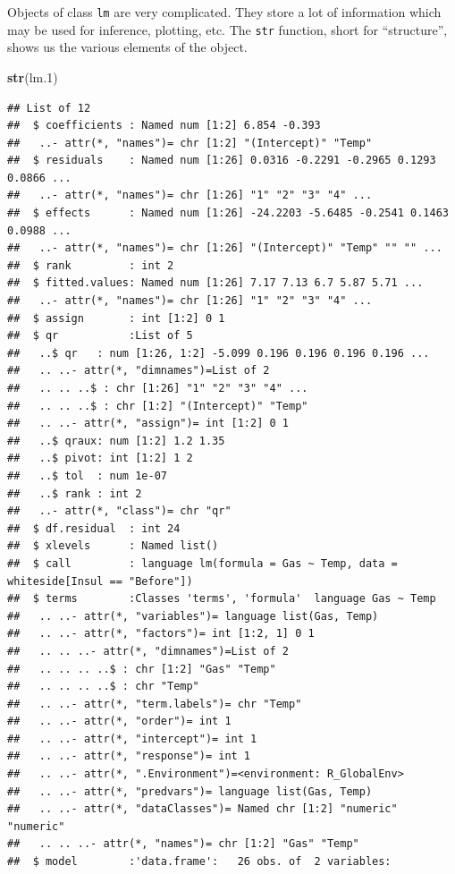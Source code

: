 \documentclass[]{book}
\newenvironment{Shaded}{\begin{snugshade}}{\end{snugshade}}
\newcommand{\FloatTok}[1]{\textcolor[rgb]{0.00,0.00,0.81}{#1}}
\newcommand{\KeywordTok}[1]{\textcolor[rgb]{0.13,0.29,0.53}{\textbf{#1}}}
\newcommand{\NormalTok}[1]{#1}
\theoremstyle{definition}
\theoremstyle{definition}
\theoremstyle{definition}
\theoremstyle{remark}
\begin{document}
Objects of class \texttt{lm} are very complicated.
They store a lot of information which may be used for inference, plotting, etc.
The \texttt{str} function, short for ``structure'', shows us the various elements of the object.

\begin{Shaded}
\begin{Highlighting}[]
\KeywordTok{str}\NormalTok{(lm}\FloatTok{.1}\NormalTok{)}
\end{Highlighting}
\end{Shaded}

\begin{verbatim}
## List of 12
##  $ coefficients : Named num [1:2] 6.854 -0.393
##   ..- attr(*, "names")= chr [1:2] "(Intercept)" "Temp"
##  $ residuals    : Named num [1:26] 0.0316 -0.2291 -0.2965 0.1293 0.0866 ...
##   ..- attr(*, "names")= chr [1:26] "1" "2" "3" "4" ...
##  $ effects      : Named num [1:26] -24.2203 -5.6485 -0.2541 0.1463 0.0988 ...
##   ..- attr(*, "names")= chr [1:26] "(Intercept)" "Temp" "" "" ...
##  $ rank         : int 2
##  $ fitted.values: Named num [1:26] 7.17 7.13 6.7 5.87 5.71 ...
##   ..- attr(*, "names")= chr [1:26] "1" "2" "3" "4" ...
##  $ assign       : int [1:2] 0 1
##  $ qr           :List of 5
##   ..$ qr   : num [1:26, 1:2] -5.099 0.196 0.196 0.196 0.196 ...
##   .. ..- attr(*, "dimnames")=List of 2
##   .. .. ..$ : chr [1:26] "1" "2" "3" "4" ...
##   .. .. ..$ : chr [1:2] "(Intercept)" "Temp"
##   .. ..- attr(*, "assign")= int [1:2] 0 1
##   ..$ qraux: num [1:2] 1.2 1.35
##   ..$ pivot: int [1:2] 1 2
##   ..$ tol  : num 1e-07
##   ..$ rank : int 2
##   ..- attr(*, "class")= chr "qr"
##  $ df.residual  : int 24
##  $ xlevels      : Named list()
##  $ call         : language lm(formula = Gas ~ Temp, data = whiteside[Insul == "Before"])
##  $ terms        :Classes 'terms', 'formula'  language Gas ~ Temp
##   .. ..- attr(*, "variables")= language list(Gas, Temp)
##   .. ..- attr(*, "factors")= int [1:2, 1] 0 1
##   .. .. ..- attr(*, "dimnames")=List of 2
##   .. .. .. ..$ : chr [1:2] "Gas" "Temp"
##   .. .. .. ..$ : chr "Temp"
##   .. ..- attr(*, "term.labels")= chr "Temp"
##   .. ..- attr(*, "order")= int 1
##   .. ..- attr(*, "intercept")= int 1
##   .. ..- attr(*, "response")= int 1
##   .. ..- attr(*, ".Environment")=<environment: R_GlobalEnv> 
##   .. ..- attr(*, "predvars")= language list(Gas, Temp)
##   .. ..- attr(*, "dataClasses")= Named chr [1:2] "numeric" "numeric"
##   .. .. ..- attr(*, "names")= chr [1:2] "Gas" "Temp"
##  $ model        :'data.frame':   26 obs. of  2 variables:

\end{verbatim}
\end{document}
